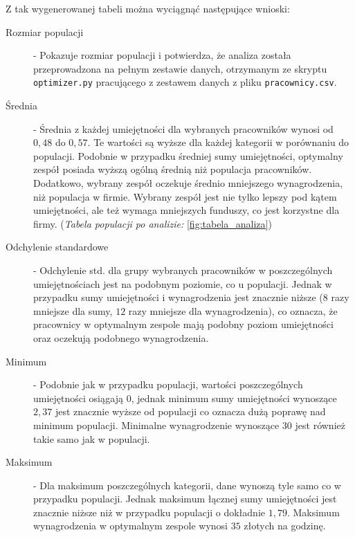     \par Z tak wygenerowanej tabeli można wyciągnąć następujące wnioski:
    \begin{description}
        \item[Rozmiar populacji\label{itm:count_2}]  - Pokazuje rozmiar populacji i potwierdza, że analiza została przeprowadzona na pełnym zestawie danych, otrzymanym ze skryptu \verb|optimizer.py| pracującego z zestawem danych z pliku \verb|pracownicy.csv|.
        
        \item[Średnia\label{itm:mean_2}] - Średnia z każdej umiejętności dla wybranych pracowników wynosi od $0,48$ do $0,57$. Te wartości są wyższe dla każdej kategorii w porównaniu do populacji. Podobnie w przypadku średniej sumy umiejętności, optymalny zespół posiada wyższą ogólną średnią niż populacja pracowników. Dodatkowo, wybrany zespół oczekuje średnio mniejszego wynagrodzenia, niż populacja w firmie. Wybrany zespół jest nie tylko lepszy pod kątem umiejętności, ale też wymaga mniejszych funduszy, co jest korzystne dla firmy. (\textit{Tabela populacji po analizie:} \ref{fig:tabela_analiza})
        
        \item[Odchylenie standardowe\label{itm:std_2}] - Odchylenie std. dla grupy wybranych pracowników w poszczególnych umiejętnościach jest na podobnym poziomie, co u populacji. Jednak w przypadku sumy umiejętności i wynagrodzenia jest znacznie niższe ($8$ razy mniejsze dla sumy, $12$ razy mniejsze dla wynagrodzenia), co oznacza, że pracownicy w optymalnym zespole mają podobny poziom umiejętności oraz oczekują podobnego wynagrodzenia.
        
        \item[Minimum\label{itm:min_2}] - Podobnie jak w przypadku populacji, wartości poszczególnych umiejętności osiągają $0$, jednak minimum sumy umiejętności wynoszące $2,37$ jest znacznie wyższe od populacji co oznacza dużą poprawę nad minimum populacji. Minimalne wynagrodzenie wynoszące $30$ jest również takie samo jak w populacji.
        
        \item[Maksimum\label{itm:max_2}] - Dla maksimum poszczególnych kategorii, dane wynoszą tyle samo co w przypadku populacji. Jednak maksimum łącznej sumy umiejętności jest znacznie niższe niż w przypadku populacji o dokładnie $1,79$. Maksimum wynagrodzenia w optymalnym zespole wynosi $35$ złotych na godzinę.
        

\end{description}
